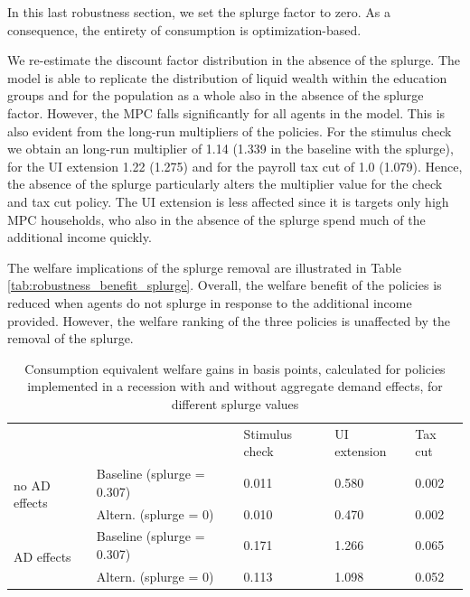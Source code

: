 \documentclass[\econtexRoot/HAFiscal]{subfiles}
\begin{document}
In this last robustness section, we set the splurge factor to zero. As a consequence, the entirety of consumption is optimization-based.

We re-estimate the discount factor distribution in the absence of the splurge. The model is able to replicate the distribution of liquid wealth within the education groups and for the population as a whole also in the absence of the splurge factor. However, the MPC falls significantly for all agents in the model. This is also evident from the long-run multipliers of the policies. For the stimulus check we obtain an long-run multiplier of 1.14 (1.339 in the baseline with the splurge), for the UI extension 1.22 (1.275) and for the payroll tax cut of 1.0 (1.079). Hence, the absence of the splurge particularly alters the multiplier value for the check and tax cut policy. The UI extension is less affected since it is targets only high MPC households, who also in the absence of the splurge spend much of the additional income quickly. 

The welfare implications of the splurge removal are illustrated in Table \ref{tab:robustness_benefit_splurge}. Overall, the welfare benefit of the policies is reduced when agents do not splurge in response to the additional income provided. However, the welfare ranking of the three policies is unaffected by the removal of the splurge. 

\begin{table}[]
	\begin{center}
		\begin{tabular}{@{}lllll@{}}
			\toprule
			&                    & Stimulus check & UI extension & Tax cut \\ \cmidrule(l){1-5} 
			\multirow{2}{*}{no AD effects} 	& Baseline  (splurge = 0.307) 		& 0.011          & 0.580        & 0.002   \\
			& Altern.  (splurge = 0) 	  & 0.010  & 0.470  & 0.002     \\ \cmidrule(l){1-5} 
			\multirow{2}{*}{AD effects}		& Baseline (splurge = 0.307)    	& 0.171          & 1.266        & 0.065   \\
			& Altern.  (splurge = 0)   & 0.113  & 1.098  & 0.052    \\ \cmidrule(l){1-5} 
		\end{tabular}
		\caption{Consumption equivalent welfare gains in basis points, calculated for policies implemented in a recession with and without aggregate demand effects, for different splurge values}
		\notinsubfile{\label{tab:robustness_benefit_splurge}}
	\end{center}
\end{table}
\end{document}

